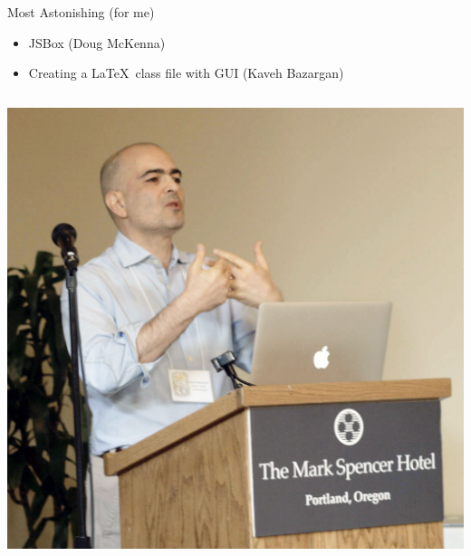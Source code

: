 \documentclass[17pt,dvipdfmx]{beamer}
\begin{document}
\begin{frame}[t]{Most Astonishing (for me)}
  \bfseries\rmfamily
    \begin{itemize}
      \item JSBox (Doug McKenna)
      \item Creating a \LaTeX\ class file with GUI (Kaveh Bazargan)
    \end{itemize}
  \begin{columns}[t]
    \begin{column}{.45\textwidth}
      \par\vspace*{-15pt}\hspace*{5pt}
      \includegraphics[width=.8\textwidth]{kaveh.jpg}

\end{column}
\end{columns}
\end{frame}
\end{document}
